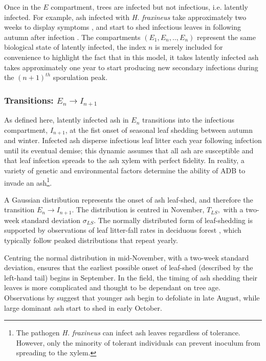 Once in the $E$ compartment, trees are infected but not infectious, i.e. latently infected.
For example, ash infected with \textit{H. fraxineus} take approximately two weeks to display symptoms \cite{https://doi.org/10.1111/ppa.12048, https://doi.org/10.1111/ppa.12844},
and start to shed infectious leaves in following autumn after infection \cite{gross2014h}.
The compartments $(E_1, E_n,..,E_n)$ represent the same biological state of latently infected, the index $n$ is merely included for convenience to highlight the fact that in this model, it takes latently infected ash takes approximately one year to start producing new secondary infections during the $(n+1)^{th}$ sporulation peak.

\subsubsection{Transitions: $E_n\rightarrow I_{n+1}$}

As defined here, latently infected ash in $E_n$ transitions into the infectious compartment, $I_{n+1}$, at the fist onset of seasonal leaf shedding between autumn and winter.
Infected ash disperse infectious leaf litter each year following infection until its eventual demise;
this dynamic assumes that all ash are susceptible and that leaf infection spreads to the ash xylem with perfect fidelity. 
In reality, a variety of genetic and environmental factors determine the ability of ADB to invade an ash\footnote{
The pathogen \textit{H. fraxineus} can infect ash leaves regardless of tolerance. However, only the minority of tolerant individuals can prevent inoculum from spreading to the xylem.}.

A Gaussian distribution represents the onset of ash leaf-shed, and therefore the transition $E_n\rightarrow I_{n+1}$.
The distribution is centred in November, $T_{LS},$ with a two-week standard deviation $\sigma_{LS}$.
The normally distributed form of leaf-shedding is supported by observations of leaf litter-fall rates in deciduous forest \cite{zhang2014seasonal, dixon1976analysis}, 
which typically follow peaked distributions that repeat yearly.

Centring the normal distribution in mid-November, with a two-week standard deviation, ensures that the earliest possible onset of leaf-shed (described by the left-hand tail) begins in September.
In the field, the timing of ash shedding their leaves is more complicated and thought to be dependant on tree age. 
Observations by \cite{hietala2013invasive} suggest that younger ash begin to defoliate in late August, while large dominant ash start to shed in early October.

